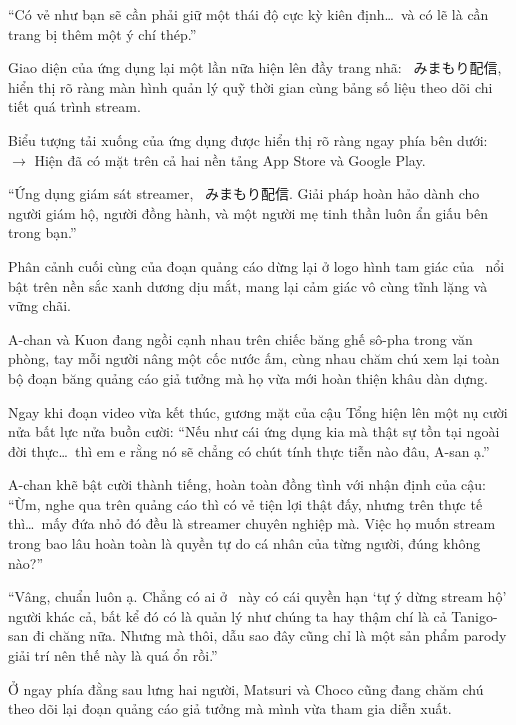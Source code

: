 \documentclass[../main.tex]{subfiles}
\begin{document}

\begin{center}
  ``Có vẻ như bạn sẽ cần phải giữ một thái độ cực kỳ kiên định\dots\ và có lẽ là cần trang bị thêm một ý chí thép.''
\end{center}

\ct

Giao diện của ứng dụng lại một lần nữa hiện lên đầy trang nhã: \hll\ みまもり配信, hiển thị rõ ràng màn hình quản lý quỹ thời gian cùng bảng số liệu theo dõi chi tiết quá trình stream.

Biểu tượng tải xuống của ứng dụng được hiển thị rõ ràng ngay phía bên dưới:
$\rightarrow$ Hiện đã có mặt trên cả hai nền tảng App Store và Google Play.

\begin{center}
  ``Ứng dụng giám sát streamer, \hll\ みまもり配信. Giải pháp hoàn hảo dành cho người giám hộ, người đồng hành, và một người mẹ tinh thần luôn ẩn giấu bên trong bạn.''
\end{center}

Phân cảnh cuối cùng của đoạn quảng cáo dừng lại ở logo hình tam giác của \hll\ nổi bật trên nền sắc xanh dương dịu mắt, mang lại cảm giác vô cùng tĩnh lặng và vững chãi.

\omk

A-chan và Kuon đang ngồi cạnh nhau trên chiếc băng ghế sô-pha trong văn phòng, tay mỗi người nâng một cốc nước ấm, cùng nhau chăm chú xem lại toàn bộ đoạn băng quảng cáo giả tưởng mà họ vừa mới hoàn thiện khâu dàn dựng.

Ngay khi đoạn video vừa kết thúc, gương mặt của cậu Tổng hiện lên một nụ cười nửa bất lực nửa buồn cười: ``Nếu như cái ứng dụng kia mà thật sự tồn tại ngoài đời thực\dots\ thì em e rằng nó sẽ chẳng có chút tính thực tiễn nào đâu, A-san ạ.''

A-chan khẽ bật cười thành tiếng, hoàn toàn đồng tình với nhận định của cậu: ``Ừm, nghe qua trên quảng cáo thì có vẻ tiện lợi thật đấy, nhưng trên thực tế thì\dots\ mấy đứa nhỏ đó đều là streamer chuyên nghiệp mà. Việc họ muốn stream trong bao lâu hoàn toàn là quyền tự do cá nhân của từng người, đúng không nào?''

``Vâng, chuẩn luôn ạ. Chẳng có ai ở \hll\ này có cái quyền hạn `tự ý dừng stream hộ' người khác cả, bất kể đó có là quản lý như chúng ta hay thậm chí là cả Tanigo-san đi chăng nữa. Nhưng mà thôi, dẫu sao đây cũng chỉ là một sản phẩm parody giải trí nên thế này là quá ổn rồi.''

Ở ngay phía đằng sau lưng hai người, Matsuri và Choco cũng đang chăm chú theo dõi lại đoạn quảng cáo giả tưởng mà mình vừa tham gia diễn xuất.
\end{document}
